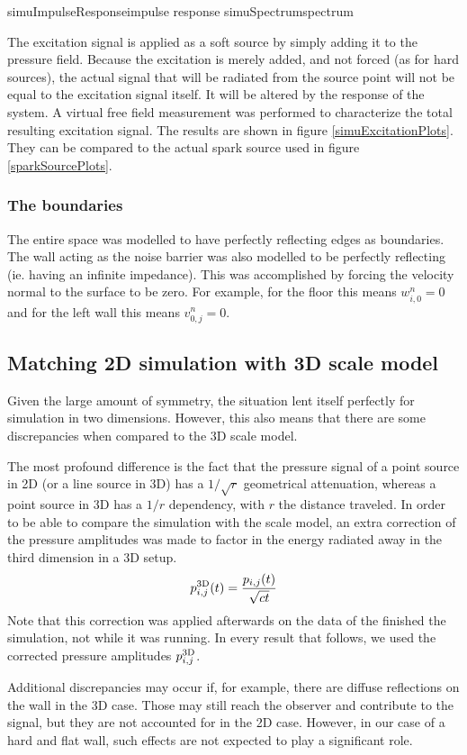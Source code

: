 	{simuImpulseResponse}{impulse response}
	{simuSpectrum}{spectrum}

The excitation signal is applied as a soft source\cite{soft-hard-source} by simply adding it to the 
pressure field. Because the excitation is merely added, and not forced (as for hard sources), the actual signal that will be 
radiated from the source point will not be equal to the excitation signal 
itself. It will be altered by the response of the system. A virtual free 
field measurement was performed to characterize the total resulting 
excitation signal. The results are shown in figure \ref{simuExcitationPlots}. They can be compared to the actual spark source used in figure \ref{sparkSourcePlots}. 



\subsubsection{The boundaries}
The entire space was modelled to have perfectly reflecting edges as boundaries. The wall acting as the noise barrier was also modelled to be perfectly reflecting (ie. having an infinite impedance). This was accomplished by forcing the velocity normal to the surface to be zero. For example, for the floor this means $w_{i,0}^n = 0$ and for the left wall this means $v_{0,j}^n = 0$.



\subsection{Matching 2D simulation with 3D scale model}
Given the large amount of symmetry, the situation lent itself perfectly for simulation in two dimensions. However, this also means that there are some discrepancies when compared to the 3D scale model.

The most profound difference is the fact that the pressure signal of a point source in 2D (or a line source in 3D) has a $1/\sqrt{r}$ geometrical attenuation, whereas a point source in 3D has a $1/r$ dependency, with $r$ the distance traveled. In order to be able to compare the simulation with the scale model, an extra correction of the pressure amplitudes was made to factor in the energy radiated away in the third dimension in a 3D setup.
$$
p_{i,j}^{\mathrm{3D}}(t) = \frac{p_{i,j}(t)}{\sqrt{ct}}
$$
Note that this correction was applied afterwards on the data of the finished the simulation, not while it was running. In every result that follows, we used the corrected pressure amplitudes $p_{i,j}^{\mathrm{3D}}$.

Additional discrepancies may occur if, for example, there are diffuse reflections on the wall in the 3D case. Those may still reach the observer and contribute to the signal, but they are not accounted for in the 2D case. However, in our case of a hard and flat wall, such effects are not expected to play a significant role.

